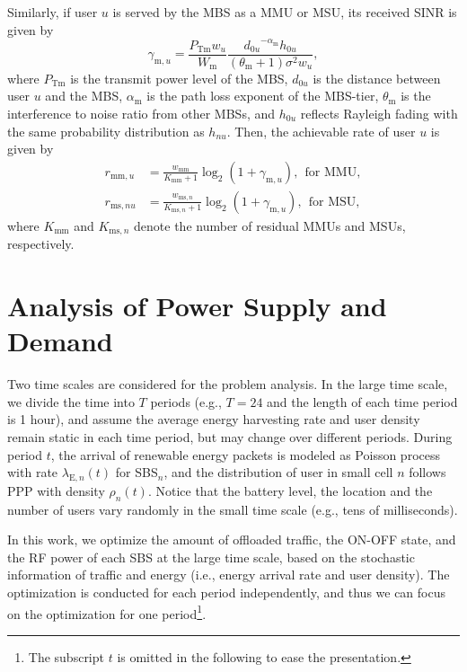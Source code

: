 \documentclass[12pt, draftclsnofoot,onecolumn]{IEEEtran}
\begin{document}
        Similarly, if user $u$ is served by the MBS as a MMU or MSU, its received SINR is given by
            \begin{equation}\label{eq_SINR_SBS}
                \gamma_{\mathrm{m},u} = \frac{P_{\mathrm{Tm}} w_u}{W_\mathrm{m}} \frac{ {d_{0u}}^{-\alpha_\mathrm{m}} h_{0u}  } { (\theta_\mathrm{m}+1) \sigma^2 w_u },
            \end{equation}
        where $P_\mathrm{Tm}$ is the transmit power level of the MBS, $d_{0u}$ is the distance between user $u$ and the MBS, $\alpha_\mathrm{m}$ is the path loss exponent of the MBS-tier, $\theta_\mathrm{m}$ is the interference to noise ratio from other MBSs, and $h_{0u}$ reflects Rayleigh fading with the same probability distribution as $h_{nu}$.
        Then, the achievable rate of user $u$ is given by
            \begin{equation}\label{eq_r_s}
                \begin{split}
                r_{\mathrm{mm},u} & = \frac{w_{\mathrm{mm}}}{K_{\mathrm{mm}}+1} \log_2 (1 + \gamma_{\mathrm{m},u}), ~~\mbox{for MMU},\\
                r_{\mathrm{ms},nu} & = \frac{w_{\mathrm{ms},n}}{K_{\mathrm{ms},n}+1} \log_2 (1 + \gamma_{\mathrm{m},u}), ~~\mbox{for MSU},
                \end{split}
            \end{equation}
        where $K_\mathrm{mm}$ and $K_{\mathrm{ms},n}$ denote the number of residual MMUs and MSUs, respectively.

 \section{Analysis of Power Supply and Demand}
    \label{sec_power_demand_supply}
    Two time scales are considered for the problem analysis.
In the large time scale, we divide the time into $T$ periods (e.g., $T=24$ and the length of each time period is 1 hour), and assume the average energy harvesting rate and user density remain static in each time period, but may change over different periods.
During period $t$, the arrival of renewable energy packets is modeled as Poisson process with rate $\lambda_{\mathrm{E},n}(t)$ for SBS$_n$, and the distribution of user in small cell $n$ follows PPP with density $\rho_n(t)$.
Notice that the battery level, the location and the number of users vary randomly in the small time scale (e.g., tens of milliseconds).

In this work, we optimize the amount of offloaded traffic, the ON-OFF state, and the RF power of each SBS at the large time scale, based on the stochastic information of traffic and energy (i.e., energy arrival rate and user density). 
The optimization is conducted for each period independently, and thus we can focus on the optimization for one period\footnote{The subscript $t$ is omitted in the following to ease the presentation.}.
\end{document}
